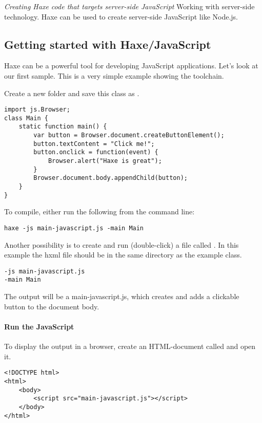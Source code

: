 \emph{Creating Haxe code that targets server-side JavaScript}
Working with server-side technology. Haxe can be used to create server-side JavaScript like Node.js.


\subsection{Getting started with Haxe/JavaScript}
\label{target-javascript-getting-started}

Haxe can be a powerful tool for developing JavaScript applications. Let's look at our first sample.
This is a very simple example showing the toolchain. 

Create a new folder and save this class as .

\begin{lstlisting}
import js.Browser;
class Main {
    static function main() {
        var button = Browser.document.createButtonElement();
        button.textContent = "Click me!";
        button.onclick = function(event) {
            Browser.alert("Haxe is great");
        }
        Browser.document.body.appendChild(button);
    }
}
\end{lstlisting}

To compile, either run the following from the command line:

\begin{lstlisting}
haxe -js main-javascript.js -main Main
\end{lstlisting}

Another possibility is to create and run (double-click) a file called . In this example the hxml file should be in the same directory as the example class.

\begin{lstlisting}
-js main-javascript.js
-main Main
\end{lstlisting}

The output will be a main-javascript.js, which creates and adds a clickable button to the document body.

\paragraph{Run the JavaScript}

To display the output in a browser, create an HTML-document called  and open it.

\begin{lstlisting}
<!DOCTYPE html>
<html>
	<body>
		<script src="main-javascript.js"></script>
	</body>
</html>
\end{lstlisting}

